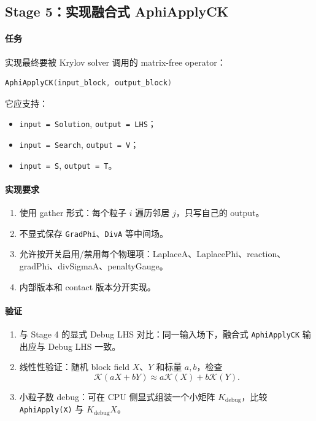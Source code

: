 \documentclass[UTF8,a4paper,11pt]{ctexart}
\newcommand{\code}[1]{\texttt{#1}}
\newcommand{\Kop}{\mathcal K}
\begin{document}
\subsection{Stage 5：实现融合式 AphiApplyCK}

\paragraph{任务}
实现最终要被 Krylov solver 调用的 matrix-free operator：
\begin{lstlisting}[language=C++]
AphiApplyCK(input_block, output_block)
\end{lstlisting}
它应支持：
\begin{itemize}
  \item \code{input = Solution}, \code{output = LHS}；
  \item \code{input = Search}, \code{output = V}；
  \item \code{input = S}, \code{output = T}。
\end{itemize}

\paragraph{实现要求}
\begin{enumerate}
  \item 使用 gather 形式：每个粒子 $i$ 遍历邻居 $j$，只写自己的 output。
  \item 不显式保存 \code{GradPhi}、\code{DivA} 等中间场。
  \item 允许按开关启用/禁用每个物理项：LaplaceA、LaplacePhi、reaction、gradPhi、divSigmaA、penaltyGauge。
  \item 内部版本和 contact 版本分开实现。
\end{enumerate}

\paragraph{验证}
\begin{enumerate}
  \item 与 Stage 4 的显式 Debug LHS 对比：同一输入场下，融合式 \code{AphiApplyCK} 输出应与 Debug LHS 一致。
  \item 线性性验证：随机 block field $X$、$Y$ 和标量 $a,b$，检查
  \begin{equation}
  \Kop(aX+bY)\approx a\Kop(X)+b\Kop(Y).
  \end{equation}
  \item 小粒子数 debug：可在 CPU 侧显式组装一个小矩阵 $K_{\mathrm{debug}}$，比较 \code{AphiApply(X)} 与 $K_{\mathrm{debug}}X$。
\end{enumerate}
\end{document}
